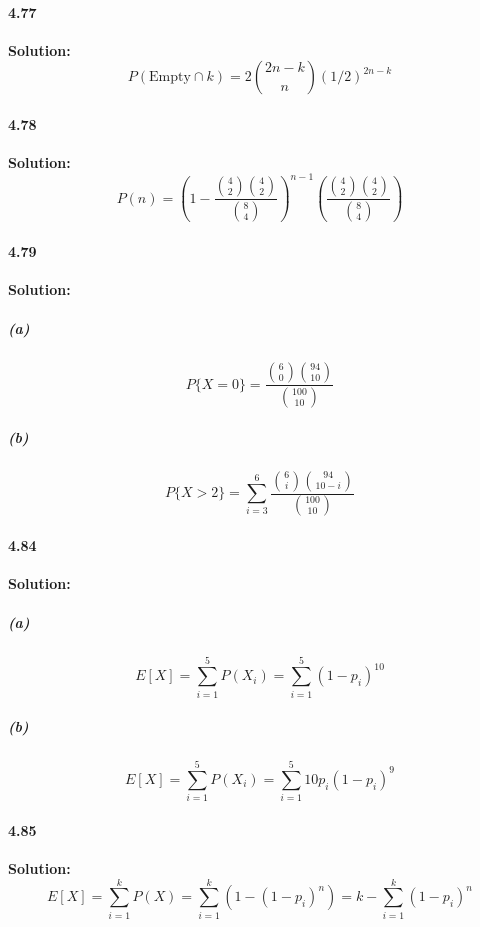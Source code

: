 \documentclass[11pt]{article}
\begin{document}
	\paragraph{4.77}\textbf{Solution:}
		\[P(\mathrm{Empty} \cap k) = 2\binom{2n - k}{n}(1/2)^{2n - k}\]
	\paragraph{4.78}\textbf{Solution:}
		\[P(n) = (1 - \frac{\binom{4}{2}\binom{4}{2}}{\binom{8}{4}})^{n - 1}(\frac{\binom{4}{2}\binom{4}{2}}{\binom{8}{4}})\]
	\paragraph{4.79}\textbf{Solution:}
		\subparagraph{(a)}
			\[P\{X = 0\} = \frac{\binom{6}{0}\binom{94}{10}}{\binom{100}{10}}\]
		\subparagraph{(b)}
			\[P\{X > 2\} = \sum_{i = 3}^{6} \frac{\binom{6}{i}\binom{94}{10 - i}}{\binom{100}{10}}\]
	\paragraph{4.84}\textbf{Solution:}
		\subparagraph{(a)}
			\[E[X] = \sum_{i = 1}^5 P(X_i) = \sum_{i = 1}^5 (1 - p_i)^{10}\]
		\subparagraph{(b)}
			\[E[X] = \sum_{i = 1}^5 P(X_i) = \sum_{i = 1}^5 10p_i(1 - p_i)^{9}\]
	\paragraph{4.85}\textbf{Solution:}
		\[E[X] = \sum_{i = 1}^kP(X) = \sum_{i = 1}^k(1 - (1 - p_i)^n) = k - \sum_{i = 1}^k(1 - p_i)^n\]
\end{document}
